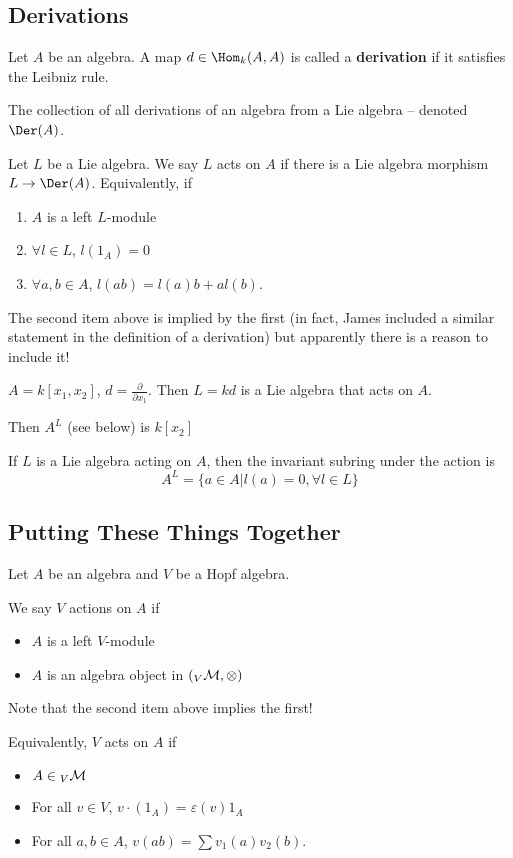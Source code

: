 \documentclass[12pt]{article}
\begin{document}
\subsection{Derivations}
\begin{defn}
	Let $A$ be an algebra. A map $d\in\Hom_k(A,A)$ is called a \textbf{derivation} if
	it satisfies the Leibniz rule.
\end{defn}
\begin{lem}
	The collection of all derivations of an algebra from a Lie algebra -- denoted $\Der(A)$.
\end{lem}
\begin{defn}
	Let $L$ be a Lie algebra. We say $L$ acts on $A$ if there is a Lie algebra morphism $L\to \Der(A)$.
	Equivalently, if
	\begin{enumerate}
		\item $A$ is a left $L$-module
		\item $\forall l\in L$, $l(1_A)=0$
		\item $\forall a,b\in A$, $l(ab)=l(a)b+al(b)$.
	\end{enumerate}
\end{defn}
\begin{rmk}
	The second item above is implied by the first (in fact, James included a similar statement in 
	the definition of a derivation) but apparently there is a reason to include it!
\end{rmk}
\begin{ex}
	$A=k[x_1,x_2]$, $d=\frac{\partial}{\partial x_1}$. Then $L=kd$ is a Lie algebra that acts on $A$.

	Then $A^L$ (see below) is $k[x_2]$
\end{ex}
\begin{defn}
	If $L$ is a Lie algebra acting on $A$, then the invariant subring under the action is
	\[A^L=\{a\in A|l(a)=0,\forall l\in L\}\]
\end{defn}

\subsection{Putting These Things Together}
Let $A$ be an algebra and $V$ be a Hopf algebra.
\begin{defn}
	We say $V$ actions on $A$ if
	\begin{itemize}
		\item $A$ is a left $V$-module
		\item $A$ is an algebra object in $({_V\cal M},\otimes)$
	\end{itemize}
	Note that the second item above implies the first!

	Equivalently, $V$ acts on $A$ if
	\begin{itemize}
		\item $A\in {_V\cal M}$
		\item For all $v\in V$, $v\cdot(1_A)=\varepsilon(v)1_A$
		\item For all $a,b\in A$, $v(ab)=\sum v_1(a)v_2(b)$.
	\end{itemize}
\end{defn}
\end{document}
